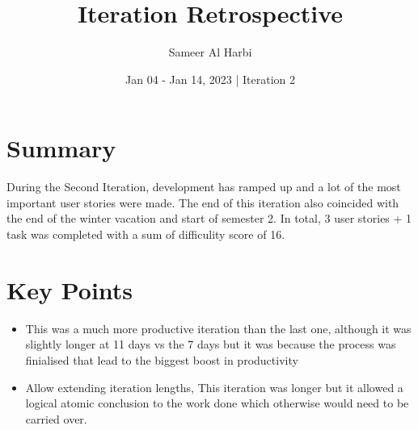 \documentclass{article}
\title{Iteration Retrospective}
\author{Sameer Al Harbi}
\date{Jan 04 - Jan 14, 2023 | Iteration 2}
\begin{document}
\maketitle

\section{Summary}
During the Second Iteration, development has ramped up and a lot of the most important user stories were made. 
The end of this iteration also coincided with the end of the winter vacation and start of semester 2. In total, 3 user stories + 1 task
was completed with a sum of difficulity score of 16.

\section{Key Points}
\begin{itemize}
    \item This was a much more productive iteration than the last one, although it was slightly longer at 11 days vs the 7 days but it was because the process was finialised that lead to the biggest boost in productivity
    \item Allow extending iteration lengths, This iteration was longer but it allowed a logical atomic conclusion to the work done which otherwise would need to be carried over. 
\end{itemize}
\end{document}
